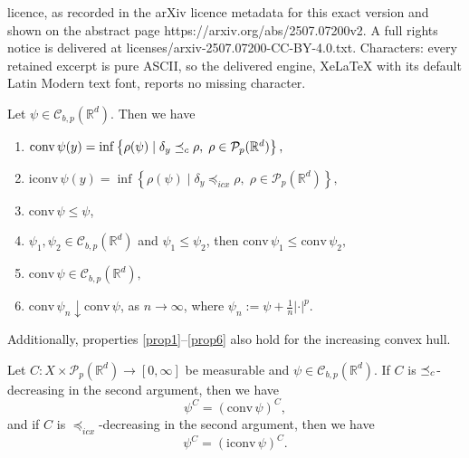 \documentclass[10pt,a4paper]{amsart}
\newcommand{\PP}{\mathcal{P}}
\newcommand{\R}{\mathbb R}
\newcommand{\conv}{\mathrm{conv}\,}
\newcommand{\iconv}{\mathrm{iconv}\,}
\newcommand{\lc}{\preceq_{\textnormal{c}}}
\newcommand{\lic}{\preceq_{icx}}
\begin{document}
licence, as recorded in the arXiv licence metadata for this exact version and shown on the abstract page https://arxiv.org/abs/2507.07200v2. A full rights notice is delivered at licenses/arxiv-2507.07200-CC-BY-4.0.txt. Characters: every retained excerpt is pure ASCII, so the delivered engine, XeLaTeX with its default Latin Modern text font, reports no missing character.
\begin{lemma} \label{repr lemm}
    Let $\psi \in {\mathcal{C}}_{b,p}(\R^d)$. Then we have 
    \begin{enumerate}[label=(\roman*)]\label{repr enac}
     \item \label{conv repr bullet}  $\conv{\psi}(y)=\inf\left\{\rho(\psi) \mid \delta_y\lc\rho,\; \rho\in\PP_p(\R^d)\right\},$
     \item \label{iconv repr bullet}  $\iconv{\psi}(y)=\inf\left\{\rho(\psi) \mid \delta_y\lic\rho,\; \rho\in\PP_p(\R^d)\right\},$
      \item \label{prop1} $\conv{\psi}\leq \psi$,
     \item \label{prop3}$\psi_1,\psi_2\in{\mathcal{C}}_{b,p}(\R^d)$ and $\psi_1\leq\psi_2$, then $\conv{\psi_1}\leq \conv{\psi_2},$
    \item \label{prop4}$\conv{\psi}\in{\mathcal{C}}_{b,p}(\R^d),$
    \item \label{prop6}$\conv{\psi_n}\downarrow \conv{\psi}$, as $n\to\infty$, where $\psi_n:=\psi+\frac{1}{n}|\cdot|^p.$
    \end{enumerate}
Additionally, properties \ref{prop1}--\ref{prop6} also hold for the increasing convex hull.
\end{lemma}

\begin{lemma} \label{rc stabil lemma}
    Let $C:X\times\PP_p(\R^d)\to[0,\infty]$ be measurable and $\psi\in {\mathcal{C}}_{b,p}(\R^d)$. If $C$ is $\lc$-decreasing in the second argument, then we have $$ \psi^C=({\conv{\psi}})^C,$$
    and if $C$ is $\lic$-decreasing in the second argument, then we have $$ \psi^C=({\iconv{\psi}})^C.$$
\end{lemma}
\end{document}
